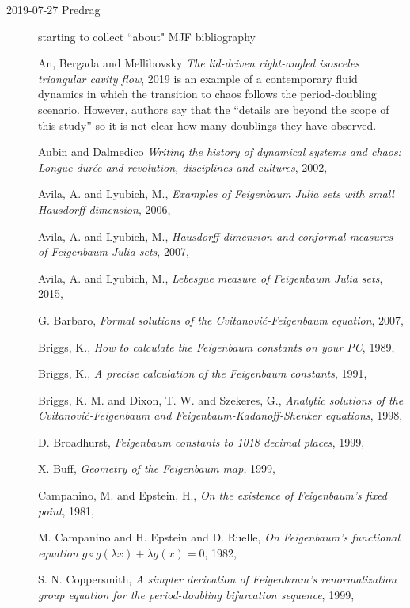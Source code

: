 \begin{description}
\item[2019-07-27 Predrag]
starting to collect ``about" MJF bibliography

{An, Bergada and Mellibovsky}
{\em The lid-driven right-angled isosceles triangular cavity flow},
{2019}
is an example of a contemporary fluid dynamics in which the transition to
chaos follows the period-doubling scenario. However, authors say that the
``details are beyond the scope of this study'' so it is not clear how
many doublings they have observed.

Aubin and Dalmedico
{\em Writing the history of dynamical systems and chaos: {Longue}
dur{\'{e}}e and revolution, disciplines and cultures},
{2002},

{Avila, A. and Lyubich, M.},
  {\em Examples of {Feigenbaum Julia} sets with small {Hausdorff} dimension},
{2006},

{Avila, A. and Lyubich, M.},
  {\em Hausdorff dimension and conformal measures of {Feigenbaum Julia} sets},
{2007},

{Avila, A. and Lyubich, M.},
{\em Lebesgue measure of Feigenbaum Julia sets},
{2015},

{G. Barbaro},
{\em Formal solutions of the {Cvitanovi{\'c}-Feigenbaum} equation},
{2007},

{Briggs, K.},
{\em How to calculate the {Feigenbaum} constants on your {PC}},
{1989},

{Briggs, K.},
{\em A precise calculation of the {Feigenbaum} constants},
{1991},

{Briggs, K. M. and Dixon, T. W. and Szekeres, G.},
{\em Analytic solutions of the {Cvitanovi{\'c}-Feigenbaum} and {Feigenbaum-Kadanoff-Shenker} equations},
{1998},

{D. Broadhurst},
{\em Feigenbaum constants to 1018 decimal places},
{1999},

{X. Buff},
{\em Geometry of the {Feigenbaum} map},
{1999},

{Campanino, M. and Epstein, H.},
{\em On the existence of {Feigenbaum's} fixed point},
{1981},

{M. Campanino and H. Epstein and D. Ruelle},
{\em On {Feigenbaum}'s functional equation {$g \circ g(\lambda x) + \lambda g(x) = 0$}},
{1982},

{S. N. Coppersmith},
{\em A simpler derivation of {Feigenbaum}'s renormalization group equation for the period-doubling bifurcation sequence},
{1999},


\end{description}
